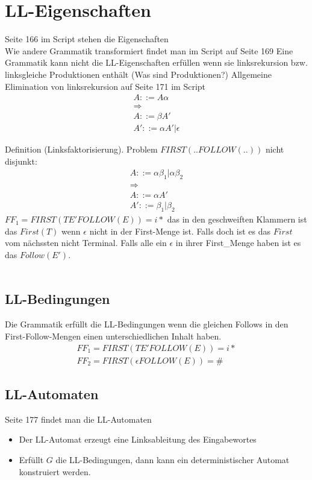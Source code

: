 \section{LL-Eigenschaften}
Seite 166 im Script stehen die Eigenschaften \\
Wie andere Grammatik transformiert findet man im Script auf Seite 169
Eine Grammatik kann nicht die LL-Eigenschaften erfüllen wenn sie linksrekursion bzw. linksgleiche Produktionen enthält (Was sind Produktionen?)
Allgemeine Elimination von linksrekursion auf Seite 171 im Script
\begin{align*}
    A::= A \alpha \\
    \Longrightarrow \\
    A::= \beta A' \\
    A'::=\alpha A' | \epsilon
\end{align*}

Definition (Linksfaktorisierung). Problem $FIRST(..FOLLOW(..))$ nicht disjunkt:
\begin{align*}
  A::=\alpha \beta_1  |  \alpha \beta_2 \\
  \Longrightarrow\\
  A::= \alpha A'\\
  A'::= \beta_1  |  \beta_2
\end{align*}
$FF_1 = FIRST(T E' FOLLOW(E))={i*}$ das in den geschweiften Klammern ist das $First(T)$ wenn $\epsilon$ nicht in der First-Menge ist. 
Falls doch ist es das $First$ vom nächssten nicht Terminal. 
Falls alle ein $\epsilon$ in ihrer First\_Menge haben ist es das $Follow(E')$.\\
\\

\subsection{LL-Bedingungen \label{ref}}
Die Grammatik erfüllt die LL-Bedingungen wenn die gleichen Follows in den First-Follow-Mengen einen unterschiedlichen Inhalt haben.
\begin{align*}
  FF_1 = FIRST(T E' FOLLOW(E))={i*}\\
  FF_2 = FIRST(\epsilon FOLLOW(E))={\#}
\end{align*}



\subsection{LL-Automaten}
Seite 177 findet man die LL-Automaten \\
\begin{itemize}
  \item Der LL-Automat erzeugt eine Linksableitung des Eingabewortes
  \item Erfüllt $G$ die LL-Bedingungen, dann kann ein deterministischer Automat konstruiert werden.
\end{itemize}

